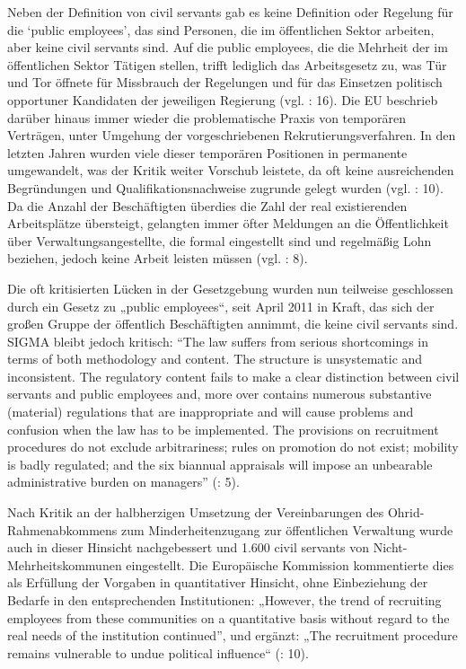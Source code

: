 Neben der Definition von civil servants gab es keine Definition oder Regelung für die ‘public employees’, das sind Personen, die im öffentlichen Sektor arbeiten, aber keine civil servants sind. Auf die public employees, die die Mehrheit der im öffentlichen Sektor Tätigen stellen, trifft lediglich das Arbeitsgesetz zu, was Tür und Tor öffnete für Missbrauch der Regelungen und für das Einsetzen politisch opportuner Kandidaten der jeweiligen Regierung (vgl. \cite{analyt07}: 16). Die EU beschrieb darüber hinaus immer wieder die problematische Praxis von temporären Verträgen, unter Umgehung der vorgeschriebenen Rekrutierungsverfahren. In den letzten Jahren wurden viele dieser temporären Positionen in permanente umgewandelt, was der Kritik weiter Vorschub leistete, da oft keine ausreichenden Begründungen und Qualifikationsnachweise zugrunde gelegt wurden (vgl. \cite{eurcom11b}: 10). Da die Anzahl der Beschäftigten überdies die Zahl der real existierenden Arbeitsplätze übersteigt, gelangten immer öfter Meldungen an die Öffentlichkeit über Verwaltungsangestellte, die formal eingestellt sind und regelmäßig Lohn beziehen, jedoch keine Arbeit leisten müssen (vgl. \cite{malahova}: 8).\par
Die oft kritisierten Lücken in der Gesetzgebung wurden nun teilweise geschlossen durch ein Gesetz zu „public employees“, seit April 2011 in Kraft, das sich der großen Gruppe der öffentlich Beschäftigten annimmt, die keine civil servants sind. SIGMA bleibt jedoch kritisch: “The law suffers from serious shortcomings in terms of both methodology and content. The structure is unsystematic and inconsistent. The regulatory content fails to make a clear distinction between civil servants and public employees and, more over contains numerous substantive (material) regulations that are inappropriate and will cause problems and confusion when the law has to be implemented. The provisions on recruitment procedures do not exclude arbitrariness; rules on promotion do not exist; mobility is badly regulated; and the six biannual appraisals will impose an unbearable administrative burden on managers” (\cite{oecd10c}: 5).\par
Nach Kritik an der halbherzigen Umsetzung der Vereinbarungen des Ohrid-Rahmenabkommens zum Minderheitenzugang zur öffentlichen Verwaltung wurde auch in dieser Hinsicht nachgebessert und 1.600 civil servants von Nicht-Mehrheitskommunen eingestellt. Die Europäische Kommission kommentierte dies als Erfüllung der Vorgaben in quantitativer Hinsicht, ohne Einbeziehung der Bedarfe in den entsprechenden Institutionen: „However, the trend of recruiting employees from these communities on a quantitative basis without regard to the real needs of the institution continued”, und ergänzt: „The recruitment procedure remains vulnerable to undue political influence“ (\cite{eurcom11b}: 10).\par
